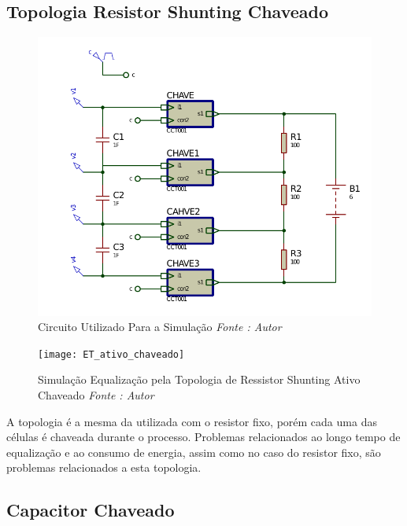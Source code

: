\documentclass[11pt, a4paper, oneside]{article}
\begin{document}
\newpage
\subsection{Topologia Resistor Shunting Chaveado}

\begin{figure}[h!]
\centering
\includegraphics[width=.7\linewidth]{et_1}
\caption{Circuito Utilizado Para a Simulação \textit{Fonte : Autor}}
\label{fig:estrutura_equalizador_passivo_ apacitor}
\end{figure}

\begin{figure}[h!]
\centering
\texttt{[image: ET\_ativo\_chaveado]}
\caption{Simulação Equalização pela Topologia de Ressistor Shunting Ativo Chaveado \textit{Fonte : Autor}}
\label{fig:estrutura_equalizador_passivo_ apacitor}
\end{figure}	

A topologia é a mesma da utilizada com o resistor fixo, porém cada uma das
células é chaveada durante o processo. Problemas relacionados ao longo tempo de
equalização e ao consumo de energia, assim como no caso do resistor fixo, são
problemas relacionados a esta topologia.

\newpage

\subsection{Capacitor Chaveado}
\end{document}

